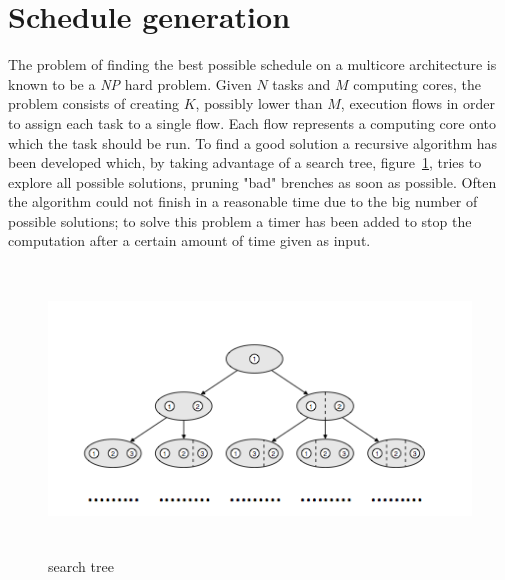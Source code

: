 \documentclass[a4paper,11pt,oneside]{book}
\begin{document}
\section{Schedule generation}
\label{schedulegeneration}

The problem of finding the best possible schedule on a multicore architecture is known to be a \emph{NP} hard problem. Given $N$ tasks and $M$ computing cores, the problem consists of creating $K$, possibly lower than $M$, execution flows in order to assign each task to a single flow. Each flow represents a computing core onto which the task should be run. To find a good solution a recursive algorithm has been developed which, by taking advantage of a search tree, figure~\ref{search_tree}, tries to explore all possible solutions, pruning "bad" brenches as soon as possible. Often the algorithm could not finish in a reasonable time due to the big number of possible solutions; to solve this problem a timer has been added to stop the computation after a certain amount of time given as input. \\

\begin{figure}[H]
\centering
\includegraphics[width = 130mm, height = 76mm]{search_tree.png}
\caption{search tree}
\label{search_tree}
\end{figure}
\end{document}
